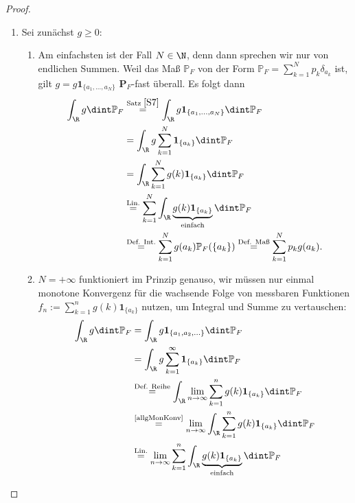 \marginpar{\textcolor{red}{Vorlesung 13}}

\begin{proof}\abs
	
	\begin{enumerate}[label=(\roman*)]
		\item Sei zun\"achst $g \geq 0$: \begin{enumerate}[label=(\alph*)]
			\item Am einfachsten ist der Fall $N \in \N$, denn dann sprechen wir nur von endlichen Summen. Weil das Ma\ss{} $\mathbb{P}_F$ von der Form $\mathbb{P}_F = \sum_{k = 1}^{N} p_k \delta_{a_k} $ ist, gilt $g = g \mathbf{1}_{\{ a_1,...,a_N \}}$  $\mathbf P_F$-fast überall. Es folgt dann
			\begin{align*}
				\int_{\R} g \dint \mathbb{P}_F &\overset{\text{Satz }\ref{S7}}{=} \int_{\R} g\mathbf{1}_{\{ a_1,...,a_N \}} \dint \mathbb{P}_F\\
				& = \int_{\R} g \sum_{k = 1}^{N} \mathbf{1}_{ \{ a_k \}} \dint \mathbb{P}_F\\
				&= \int_{\R} \sum_{k = 1}^{N} g(k) \mathbf{1}_{ \{ a_k \}} \dint \mathbb{P}_F\\
				& \overset{\text{Lin.}}{=} \sum_{k = 1}^{N} \int_{\R} \underbrace{g(k) \mathbf{1}_{ \{ a_k \}}}_{\text{einfach}} \dint \mathbb{P}_F\\
				&\overset{\text{Def. Int.}}{=} \sum_{k = 1}^{N} g(a_k) \mathbb{P}_F(\{ a_k \}) \overset{\text{Def. Ma\ss}}{=} \sum_{k = 1}^{N} p_k g(a_k).
			\end{align*}
			\item $N = + \infty$ funktioniert im Prinzip genauso, wir m\"ussen nur einmal monotone Konvergenz f\"ur die wachsende Folge von messbaren Funktionen $f_n:=\sum_{k = 1}^{n} g(k) \mathbf{1}_{ \{ a_k \}}$ nutzen, um Integral und Summe zu vertauschen:
			\begin{align*}
				\int_{\R} g \dint \mathbb{P}_F &= \int_{\R} g\mathbf{1}_{\{ a_1,a_2,... \}} \dint \mathbb{P}_F\\
				& = \int_{\R} g \sum_{k = 1}^{\infty} \mathbf{1}_{ \{ a_k \}} \dint \mathbb{P}_F\\
			&\overset{\text{Def. Reihe}}{=} \int_{\R} \lim\limits_{n \to \infty} \sum_{k = 1}^{n} g(k) \mathbf{1}_{ \{ a_k \}} \dint \mathbb{P}_F\\
			& \overset{\text{\ref{allgMonKonv}}}{=} \lim_{n\to\infty} \int_{\R}\sum_{k = 1}^{n} g(k) \mathbf{1}_{ \{ a_k \}}\dint \mathbb{P}_F\\
			& \overset{\text{Lin.}}{=} \lim_{n\to\infty}\sum_{k = 1}^{n} \int_{\R} \underbrace{g(k) \mathbf{1}_{ \{ a_k \}}}_{\text{einfach}} \dint \mathbb{P}_F\\

\end{align*}
\end{enumerate}
\end{enumerate}
\end{proof}

